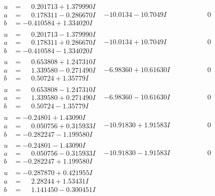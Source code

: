 \documentclass[1p]{elsarticle_modified}
\theoremstyle{definition}
\begin{document}
$$\begin{array}{c|c|c}
\begin{aligned}
u &= \phantom{-}0.201713 + 1.379990 I \\
a &= \phantom{-}0.178311 - 0.286670 I \\
b &= -0.410584 + 1.334020 I\end{aligned}
 & -10.0134 - 10.7049 I & \phantom{-0.000000 } 0 \\ \hline\begin{aligned}
u &= \phantom{-}0.201713 - 1.379990 I \\
a &= \phantom{-}0.178311 + 0.286670 I \\
b &= -0.410584 - 1.334020 I\end{aligned}
 & -10.0134 + 10.7049 I & \phantom{-0.000000 } 0 \\ \hline\begin{aligned}
u &= \phantom{-}0.653808 + 1.247310 I \\
a &= \phantom{-}1.339580 - 0.271490 I \\
b &= \phantom{-}0.50724 + 1.35779 I\end{aligned}
 & -6.98360 + 10.61630 I & \phantom{-0.000000 } 0 \\ \hline\begin{aligned}
u &= \phantom{-}0.653808 - 1.247310 I \\
a &= \phantom{-}1.339580 + 0.271490 I \\
b &= \phantom{-}0.50724 - 1.35779 I\end{aligned}
 & -6.98360 - 10.61630 I & \phantom{-0.000000 } 0 \\ \hline\begin{aligned}
u &= -0.24801 + 1.43090 I \\
a &= \phantom{-}0.050756 + 0.315933 I \\
b &= -0.282247 - 1.199580 I\end{aligned}
 & -10.91830 + 1.91583 I & \phantom{-0.000000 } 0 \\ \hline\begin{aligned}
u &= -0.24801 - 1.43090 I \\
a &= \phantom{-}0.050756 - 0.315933 I \\
b &= -0.282247 + 1.199580 I\end{aligned}
 & -10.91830 - 1.91583 I & \phantom{-0.000000 } 0 \\ \hline\begin{aligned}
u &= -0.287870 + 0.421955 I \\
a &= \phantom{-}2.28244 + 1.53431 I \\
b &= \phantom{-}1.141450 - 0.300451 I\end{aligned}

\end{array}$$
\end{document}

